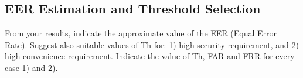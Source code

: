 \documentclass[a4paper,12pt]{article}
\begin{document}
\subsection{EER Estimation and Threshold Selection}
From your results, indicate the approximate value of the EER (Equal Error Rate). Suggest also suitable values of Th for: 1) high security requirement, and 2) high convenience requirement. Indicate the value of Th, FAR and FRR for every case 1) and 2).



\tableofcontents
\newpage

\listoffigures
\newpage

\listoftables
\newpage


\newpage
\printbibliography
\end{document}
